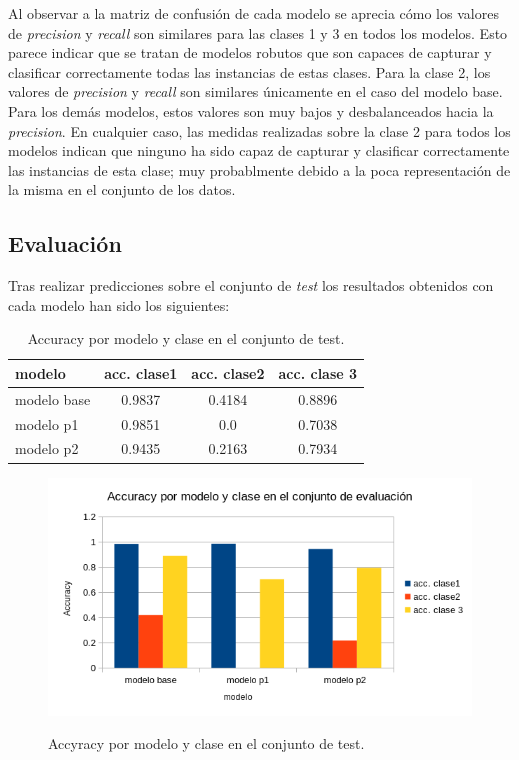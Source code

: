 \documentclass[es]{uc3mreport}
\begin{document}
\begin{report}
Al observar a la matriz de confusión de cada modelo
se aprecia cómo los valores de \textit{precision} y \textit{recall} son
similares para las clases 1 y 3 en todos los modelos. Esto parece indicar que se
tratan de modelos robutos que son capaces de capturar y clasificar correctamente
todas las instancias de estas clases. Para la clase 2, los valores de \textit{precision} y \textit{recall} son
similares únicamente en el caso del modelo base. Para los demás modelos, estos
valores son muy bajos y desbalanceados hacia la \textit{precision}. En cualquier
caso, las medidas realizadas sobre la clase 2 para todos los modelos indican que
ninguno ha sido capaz de capturar y clasificar correctamente las instancias de
esta clase; muy probablmente debido a la poca representación de la misma en el
conjunto de los datos.

\subsection{Evaluación}
\label{subsec:comparar_test}

Tras realizar predicciones sobre el conjunto de \textit{test} los resultados
obtenidos con cada modelo han sido los siguientes:

\begin{table}[H]
\center
\begin{tabular}{@{}lccc@{}}
    \toprule
    modelo      & acc. clase1&	acc. clase2	& acc. clase 3 \\
    \midrule     
    modelo base & 0.9837     & 0.4184	& 0.8896 \\
    modelo p1   & 0.9851     & 0.0	    & 0.7038 \\
    modelo p2   & 0.9435     & 0.2163	& 0.7934 \\
    \bottomrule
\end{tabular}
    \caption{Accuracy por modelo y clase en el conjunto de test.}
\end{table}
\begin{figure}[H]
    \center
    \includegraphics[width=0.85\linewidth]{accModClassTest.png}\\
    \caption{Accyracy por modelo y clase en el conjunto de test.}
\end{figure}


\end{report}
\end{document}
